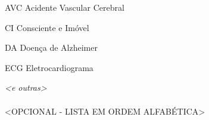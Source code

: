 \begin{siglas}
\item[AVC] Acidente Vascular Cerebral
\item[CI] Consciente e Imóvel
\item[DA] Doença de Alzheimer
\item [ECG] Eletrocardiograma

\textit{<e outras>}
\\
\\
<OPCIONAL - LISTA EM ORDEM ALFABÉTICA>
\end{siglas}